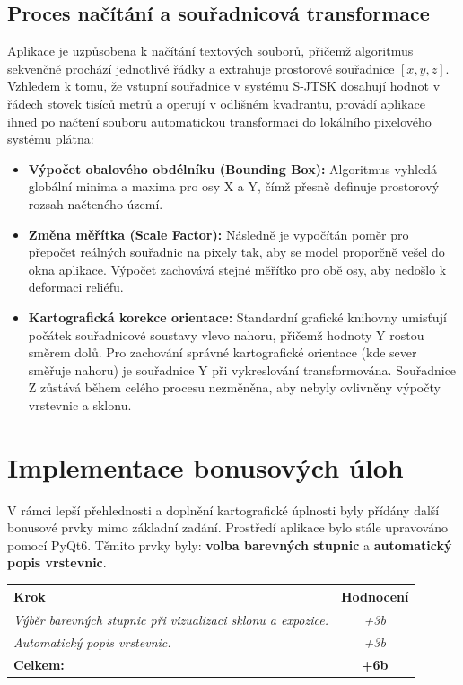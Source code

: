 \documentclass[12pt, a4paper]{article}
\begin{document}
\subsection{Proces načítání a souřadnicová transformace}
Aplikace je uzpůsobena k načítání textových souborů, přičemž algoritmus sekvenčně prochází jednotlivé řádky a extrahuje prostorové souřadnice $[x, y, z]$. Vzhledem k tomu, že vstupní souřadnice v systému S-JTSK dosahují hodnot v řádech stovek tisíců metrů a operují v odlišném kvadrantu, provádí aplikace ihned po načtení souboru automatickou transformaci do lokálního pixelového systému plátna:

\begin{itemize}
    \item \textbf{Výpočet obalového obdélníku (Bounding Box):} Algoritmus vyhledá globální minima a maxima pro osy X a Y, čímž přesně definuje prostorový rozsah načteného území.
    \item \textbf{Změna měřítka (Scale Factor):} Následně je vypočítán poměr pro přepočet reálných souřadnic na pixely tak, aby se model proporčně vešel do okna aplikace. Výpočet zachovává stejné měřítko pro obě osy, aby nedošlo k deformaci reliéfu.
    \item \textbf{Kartografická korekce orientace:} Standardní grafické knihovny umisťují počátek souřadnicové soustavy vlevo nahoru, přičemž hodnoty Y rostou směrem dolů. Pro zachování správné kartografické orientace (kde sever směřuje nahoru) je souřadnice Y při vykreslování transformována. Souřadnice Z zůstává během celého procesu nezměněna, aby nebyly ovlivněny výpočty vrstevnic a sklonu.
\end{itemize}

\section{Implementace bonusových úloh}
V rámci lepší přehlednosti a doplnění kartografické úplnosti byly přídány další bonusové prvky mimo základní zadání. Prostředí aplikace bylo stále upravováno pomocí PyQt6. Těmito prvky byly: \textbf{volba barevných stupnic} a \textbf{automatický popis vrstevnic}.

\begin{small}
\begin{longtable}{|p{15cm}|c|}

\hline
\textbf{Krok} & \textbf{Hodnocení} \\ \hline\hline
\textit{Výběr barevných stupnic při vizualizaci sklonu a expozice.} & \textit{+3b} \\ \hline
\textit{Automatický popis vrstevnic.} & \textit{+3b} \\ \hline
\textbf{Celkem:} & \textbf{+6b} \\ \hline
\end{longtable}
\end{small}
\vspace{2em}
\end{document}
